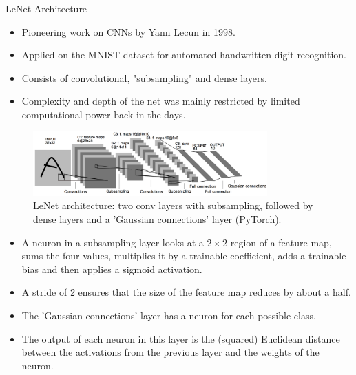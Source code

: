 \begin{vbframe}{LeNet Architecture}
  \begin{itemize}
    \item Pioneering work on CNNs by Yann Lecun in 1998. 
    \item Applied on the MNIST dataset for automated handwritten digit recognition.
    \item Consists of convolutional, "subsampling" and dense layers.
    \item Complexity and depth of the net was mainly restricted by limited computational power back in the days.
  \end{itemize}
  \begin{figure}
  \centering
    \includegraphics[width=9cm]{plots/architectures/lenet.png}
    \caption{LeNet architecture: two conv layers with subsampling, followed by dense layers and a 'Gaussian connections' layer (PyTorch).}
  \end{figure}
  \framebreak
  \begin{itemize}
    \item A neuron in a subsampling layer looks at a $2 \times 2$ region of a feature map, sums the four values, multiplies it by a trainable coefficient, adds a trainable bias and then applies a sigmoid activation.
    \item A stride of 2 ensures that the size of the feature map reduces by about a half.
    \item The 'Gaussian connections' layer has a neuron for each possible class. 
    \item The output of each neuron in this layer is the (squared) Euclidean distance between the activations from the previous layer and the weights of the neuron.
  \end{itemize}   
\end{vbframe}

